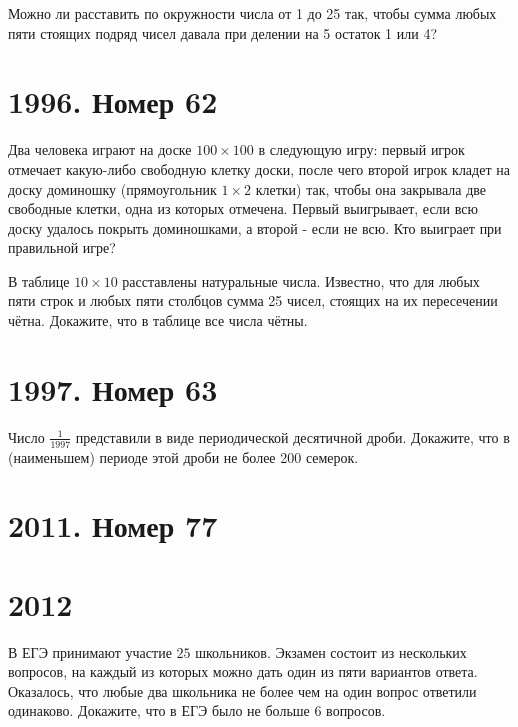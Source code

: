 \documentclass[11pt, a4paper]{common/document_template}
\begin{document}
\begin{exercise}
Можно ли расставить по окружности числа от 1 до 25 так, чтобы сумма любых пяти стоящих подряд чисел давала при делении на 5 остаток 1 или 4?
\end{exercise}

\chapter{1996. Номер 62}

\begin{exercise}
Два человека играют на доске $100 \times 100$ в следующую игру: первый игрок отмечает какую-либо свободную клетку доски, после чего второй игрок кладет на доску доминошку (прямоугольник $1 \times 2$ клетки)
так, чтобы она закрывала две свободные клетки, одна из которых отмечена. Первый выигрывает, если всю доску удалось покрыть доминошками, а второй - если не всю. Кто выиграет при правильной игре?
\end{exercise}

\begin{exercise}
В таблице $10 \times 10$ расставлены натуральные числа. Известно, что для любых пяти строк и любых пяти столбцов сумма 25 чисел, стоящих на их пересечении чётна. Докажите, что в таблице все числа чётны.
\end{exercise}

\chapter{1997. Номер 63}

\begin{exercise}
Число $\frac{1}{1997}$ представили в виде периодической десятичной
дроби. Докажите, что в (наименьшем) периоде этой дроби не более 200
семерок.
\end{exercise}

\chapter{2011. Номер 77}



\chapter{2012}

\begin{exercise}
В ЕГЭ принимают участие $25$ школьников. Экзамен состоит из нескольких вопросов, на каждый из которых можно дать один из пяти вариантов ответа. Оказалось, что любые два школьника не более чем на один вопрос ответили одинаково. Докажите, что в ЕГЭ было не больше $6$ вопросов.
\end{exercise}
\end{document}
